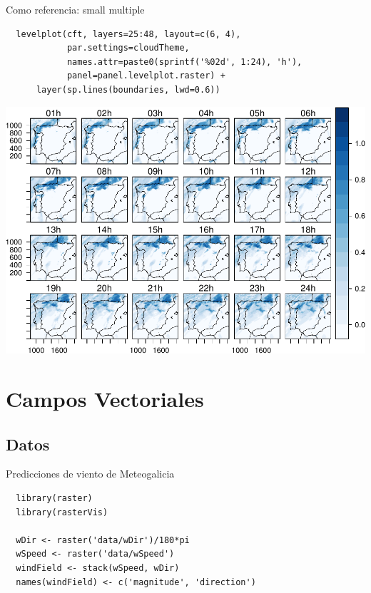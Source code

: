 \documentclass[xcolor={usenames,svgnames,dvipsnames}]{beamer}
\begin{document}
\begin{frame}[fragile,label=sec-4-5-5]{Como referencia: small multiple}
 \lstset{language=R,label= ,caption= ,numbers=none}
\begin{lstlisting}
  levelplot(cft, layers=25:48, layout=c(6, 4),
            par.settings=cloudTheme,
            names.attr=paste0(sprintf('%02d', 1:24), 'h'),
            panel=panel.levelplot.raster) +
      layer(sp.lines(boundaries, lwd=0.6))
\end{lstlisting}

\includegraphics[width=.9\linewidth]{figs/cft.pdf}
\end{frame}


\section{Campos Vectoriales}
\label{sec-5}

\subsection{Datos}
\label{sec-5-1}

\begin{frame}[fragile,label=sec-5-1-1]{Predicciones de viento de Meteogalicia}
 \lstset{language=R,label= ,caption= ,numbers=none}
\begin{lstlisting}
  library(raster)
  library(rasterVis)
  
  wDir <- raster('data/wDir')/180*pi
  wSpeed <- raster('data/wSpeed')
  windField <- stack(wSpeed, wDir)
  names(windField) <- c('magnitude', 'direction')
\end{lstlisting}
\end{frame}
\end{document}
